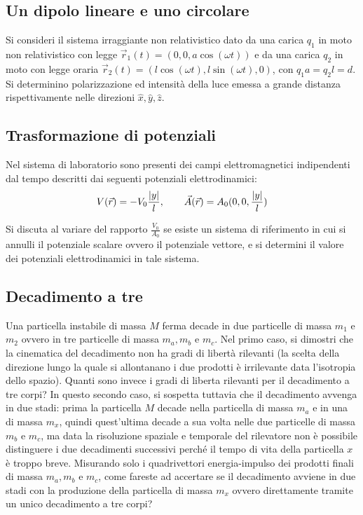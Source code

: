 	\subsection{Un dipolo lineare e uno circolare}
		Si consideri il sistema irraggiante non relativistico dato da una carica $q_1$ in moto non relativistico con legge ${\vec r}_1(t)=(0,0,a\cos(\omega t))$ e da una carica $q_2$ in moto con legge oraria ${\vec r}_2(t)=(l\cos(\omega t),l\sin(\omega t),0)$, con $q_1a=q_2l=d$. Si determinino polarizzazione ed intensità della luce emessa a grande distanza rispettivamente nelle direzioni $\hat x,\hat y,\hat z$.
	
	\subsection{Trasformazione di potenziali}
		Nel sistema di laboratorio sono presenti dei campi elettromagnetici indipendenti dal tempo descritti dai seguenti potenziali elettrodinamici:
		\[
		 V(\vec r)= -V_0 \frac{\left|y\right|}l, \qquad \vec A(\vec r)=A_0(0,0,\frac{\left|y\right|}l)
		\]
		
		Si discuta al variare del rapporto $\frac{V_0}{A_0}$ se esiste un sistema di riferimento in cui si annulli il potenziale scalare ovvero il potenziale vettore, e si determini il valore dei potenziali elettrodinamici in tale sistema.
		
	\subsection{Decadimento a tre}
		Una particella instabile di massa $M$ ferma decade in due particelle di massa $m_1$ e $m_2$ ovvero in tre particelle di massa $m_a,m_b$ e $m_c$. Nel primo caso, si dimostri che la cinematica del decadimento non ha gradi di libertà rilevanti (la scelta della direzione lungo la quale si allontanano i due prodotti è irrilevante data l'isotropia dello spazio). Quanti sono invece i gradi di liberta rilevanti per il decadimento a tre corpi? In questo secondo caso, si sospetta tuttavia che il decadimento avvenga in due stadi: prima la particella $M$ decade nella particella di massa $m_a$ e in una di massa $m_x$, quindi quest'ultima decade a sua volta nelle due particelle di massa $m_b$ e $m_c$, ma data la risoluzione spaziale e temporale del rilevatore non è possibile distinguere i due decadimenti successivi perché il tempo di vita della particella $x$ è troppo breve. Misurando solo i quadrivettori energia-impulso dei prodotti finali di massa $m_a,m_b$ e $m_c$, come fareste ad accertare se il decadimento avviene in due stadi con la produzione della particella di massa $m_x$ ovvero direttamente tramite un unico decadimento a tre corpi? 
